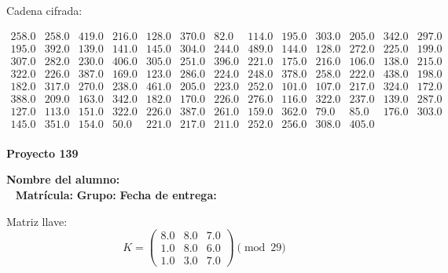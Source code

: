 \documentclass[12pt]{article}
\begin{document}
Cadena cifrada:
\begin{center}
$\begin{array}{lllllllllllll}
258.0 & 258.0 & 419.0 & 216.0 & 128.0 & 370.0 & 82.0 & 114.0 & 195.0 & 303.0 & 205.0 & 342.0 & 297.0\\
195.0 & 392.0 & 139.0 & 141.0 & 145.0 & 304.0 & 244.0 & 489.0 & 144.0 & 128.0 & 272.0 & 225.0 & 199.0\\
307.0 & 282.0 & 230.0 & 406.0 & 305.0 & 251.0 & 396.0 & 221.0 & 175.0 & 216.0 & 106.0 & 138.0 & 215.0\\
322.0 & 226.0 & 387.0 & 169.0 & 123.0 & 286.0 & 224.0 & 248.0 & 378.0 & 258.0 & 222.0 & 438.0 & 198.0\\
182.0 & 317.0 & 270.0 & 238.0 & 461.0 & 205.0 & 223.0 & 252.0 & 101.0 & 107.0 & 217.0 & 324.0 & 172.0\\
388.0 & 209.0 & 163.0 & 342.0 & 182.0 & 170.0 & 226.0 & 276.0 & 116.0 & 322.0 & 237.0 & 139.0 & 287.0\\
127.0 & 113.0 & 151.0 & 322.0 & 226.0 & 387.0 & 261.0 & 159.0 & 362.0 & 79.0 & 85.0 & 176.0 & 303.0\\
145.0 & 351.0 & 154.0 & 50.0 & 221.0 & 217.0 & 211.0 & 252.0 & 256.0 & 308.0 & 405.0\\
\end{array}$
\end{center}

\newpage


\textbf{Proyecto 139}

\textbf{Nombre del alumno:} \underline{\hspace{13cm}}\\\
\vspace{1cm}
\textbf{Matrícula:} \underline{\hspace{4cm}} \hspace{1cm}
\textbf{Grupo:} \underline{\hspace{2cm}}
\textbf{Fecha de entrega:} \underline{\hspace{2cm}}

\medskip

Matriz llave:
\[
K = \begin{pmatrix}
8.0 & 8.0 & 7.0\\
1.0 & 8.0 & 6.0\\
1.0 & 3.0 & 7.0
\end{pmatrix} \pmod{29}
\]
\end{document}
